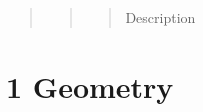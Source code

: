 \documentclass[letterpaper,10pt,english]{sphinxmanual}
\begin{document}
\begin{quote}
\begin{description}
\begin{quote}
\begin{description}
\begin{quote}
\begin{description}
\item[{Description}] \leavevmode
{}

\end{description}\end{quote}

\end{description}\end{quote}

\end{description}\end{quote}


\section{1 \textbar{} Geometry}
\label{\detokenize{components:geometry}}
\end{document}
